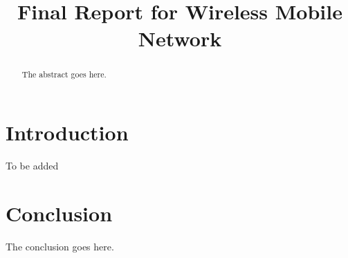 \documentclass[conference]{IEEEtran}
\begin{document}
\title{Final Report for Wireless Mobile Network}
\author{
\and
{}
\and
{}}
\maketitle
\begin{abstract}
The abstract goes here.
\end{abstract}

\section{Introduction}
To be added
\section{Conclusion}
The conclusion goes here.
\end{document}
